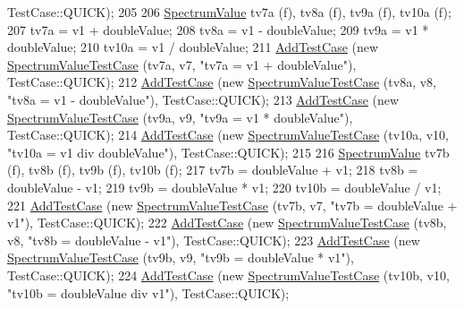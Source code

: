 \begin{DoxyCode}
      TestCase::QUICK);
205 
206   \hyperlink{classns3_1_1SpectrumValue}{SpectrumValue} tv7a (f), tv8a (f), tv9a (f), tv10a (f);
207   tv7a = v1 + doubleValue;
208   tv8a = v1 - doubleValue;
209   tv9a = v1 * doubleValue;
210   tv10a = v1 / doubleValue;
211   \hyperlink{classns3_1_1TestCase_a3718088e3eefd5d6454569d2e0ddd835}{AddTestCase} (\textcolor{keyword}{new} \hyperlink{classSpectrumValueTestCase}{SpectrumValueTestCase} (tv7a, v7, \textcolor{stringliteral}{"tv7a = v1 +
       doubleValue"}), TestCase::QUICK);
212   \hyperlink{classns3_1_1TestCase_a3718088e3eefd5d6454569d2e0ddd835}{AddTestCase} (\textcolor{keyword}{new} \hyperlink{classSpectrumValueTestCase}{SpectrumValueTestCase} (tv8a, v8, \textcolor{stringliteral}{"tv8a = v1 -
       doubleValue"}), TestCase::QUICK);
213   \hyperlink{classns3_1_1TestCase_a3718088e3eefd5d6454569d2e0ddd835}{AddTestCase} (\textcolor{keyword}{new} \hyperlink{classSpectrumValueTestCase}{SpectrumValueTestCase} (tv9a, v9, \textcolor{stringliteral}{"tv9a = v1 *
       doubleValue"}), TestCase::QUICK);
214   \hyperlink{classns3_1_1TestCase_a3718088e3eefd5d6454569d2e0ddd835}{AddTestCase} (\textcolor{keyword}{new} \hyperlink{classSpectrumValueTestCase}{SpectrumValueTestCase} (tv10a, v10, \textcolor{stringliteral}{"tv10a = v1 div
       doubleValue"}), TestCase::QUICK);
215 
216   \hyperlink{classns3_1_1SpectrumValue}{SpectrumValue} tv7b (f), tv8b (f), tv9b (f), tv10b (f);
217   tv7b =  doubleValue + v1;
218   tv8b =  doubleValue - v1;
219   tv9b =  doubleValue * v1;
220   tv10b = doubleValue / v1;
221   \hyperlink{classns3_1_1TestCase_a3718088e3eefd5d6454569d2e0ddd835}{AddTestCase} (\textcolor{keyword}{new} \hyperlink{classSpectrumValueTestCase}{SpectrumValueTestCase} (tv7b, v7, \textcolor{stringliteral}{"tv7b =  doubleValue +
       v1"}), TestCase::QUICK);
222   \hyperlink{classns3_1_1TestCase_a3718088e3eefd5d6454569d2e0ddd835}{AddTestCase} (\textcolor{keyword}{new} \hyperlink{classSpectrumValueTestCase}{SpectrumValueTestCase} (tv8b, v8, \textcolor{stringliteral}{"tv8b =  doubleValue -
       v1"}), TestCase::QUICK);
223   \hyperlink{classns3_1_1TestCase_a3718088e3eefd5d6454569d2e0ddd835}{AddTestCase} (\textcolor{keyword}{new} \hyperlink{classSpectrumValueTestCase}{SpectrumValueTestCase} (tv9b, v9, \textcolor{stringliteral}{"tv9b =  doubleValue *
       v1"}), TestCase::QUICK);
224   \hyperlink{classns3_1_1TestCase_a3718088e3eefd5d6454569d2e0ddd835}{AddTestCase} (\textcolor{keyword}{new} \hyperlink{classSpectrumValueTestCase}{SpectrumValueTestCase} (tv10b, v10, \textcolor{stringliteral}{"tv10b = doubleValue
       div v1"}), TestCase::QUICK);

\end{DoxyCode}
